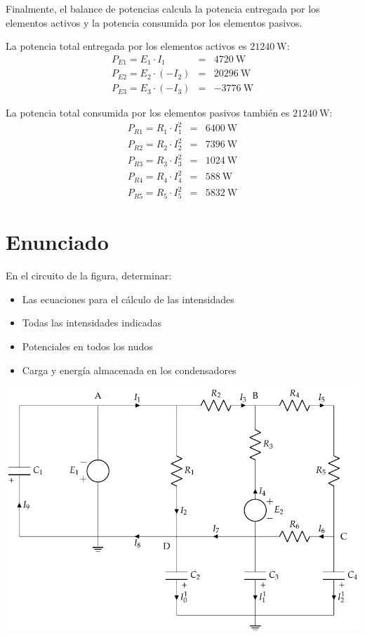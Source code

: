 Finalmente, el balance de potencias calcula la potencia entregada por los elementos activos y la potencia consumida por los elementos pasivos.

La potencia total entregada por los elementos activos es $\qty{21240}{\watt}$:
\begin{eqnarray*}
P_{E1} = E_1 \cdot I_1 & = & \qty{4720}{\watt}\\
P_{E2} = E_2 \cdot (-I_2) & = & \qty{20296}{\watt}\\
P_{E3} = E_3 \cdot (-I_3) & = & \qty{-3776}{\watt}
\end{eqnarray*}

La potencia total consumida por los elementos pasivos también es $\qty{21240}{\watt}$:
\begin{eqnarray*}
P_{R1} = R_1 \cdot I_1^2 & = & \qty{6400}{\watt}\\
P_{R2} = R_2 \cdot I_2^2 & = & \qty{7396}{\watt}\\
P_{R3} = R_3 \cdot I_3^2 & = & \qty{1024}{\watt}\\
P_{R4} = R_4 \cdot I_4^2 & = & \qty{588}{\watt}\\
P_{R5} = R_5 \cdot I_5^2 & = & \qty{5832}{\watt}
\end{eqnarray*}

\section{Enunciado}
En el circuito de la figura, determinar:
\begin{itemize}
\item Las ecuaciones para el cálculo de las intensidades
\item Todas las intensidades indicadas
\item Potenciales en todos los nudos
\item Carga y energía almacenada en los condensadores
\end{itemize}

\begin{center}
  \includegraphics{figuras/BT1_11.pdf}
\end{center}

